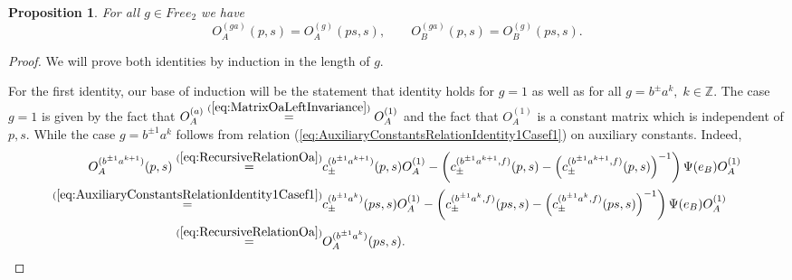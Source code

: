 \documentclass{amsart}
\newtheorem{proposition}[theorem]{Proposition}
\begin{document}
\begin{proposition}
For all $g\in Free_2$ we have
\begin{equation}
O_A^{(ga)}(p,s)=O_A^{(g)}(ps,s),\qquad O_B^{(ga)}(p,s)=O_B^{(g)}(ps,s).
\label{eq:aRightActionOnMatricesIsShift}
\end{equation}
\end{proposition}
\begin{proof}
We will prove both identities by induction in the length of $g$.

For the first identity, our base of induction will be the statement that identity holds for $g=1$ as well as for all $g=b^{\pm}a^k,\;k\in\mathbb Z$. The case $g=1$ is given by the fact that $O_A^{(a)}\overset{(\ref{eq:MatrixOaLeftInvariance})}{=}O_A^{(1)}$ and the fact that $O_A^{(1)}$ is a constant matrix which is independent of $p,s$. While the case $g=b^{\pm1}a^k$ follows from relation (\ref{eq:AuxiliaryConstantsRelationIdentity1Casef1}) on auxiliary constants. Indeed,
\begin{align*}
O_A^{(b^{\pm1}a^{k+1})}(p,s)\overset{(\ref{eq:RecursiveRelationOa})}{=}&c_{\pm}^{(b^{\pm1}a^{k+1})}(p,s)O_A^{(1)}-\left(c_{\pm}^{(b^{\pm1}a^{k+1},f)}(p,s)-\left(c_{\pm}^{(b^{\pm1}a^{k+1},f)}(p,s)\right)^{-1}\right)\Psi(e_B)O_A^{(1)}\\
\overset{(\ref{eq:AuxiliaryConstantsRelationIdentity1Casef1})}{=}&c_{\pm}^{(b^{\pm1}a^{k})}(ps,s)O_A^{(1)}-\left(c_{\pm}^{(b^{\pm1}a^k,f)}(ps,s)-\left(c_{\pm}^{(b^{\pm1}a^k,f)}(ps,s)\right)^{-1}\right)\Psi(e_B)O_A^{(1)}\\
\overset{(\ref{eq:RecursiveRelationOa})}{=}&O_A^{(b^{\pm1}a^k)}(ps,s).
\end{align*}


\end{proof}
\end{document}
